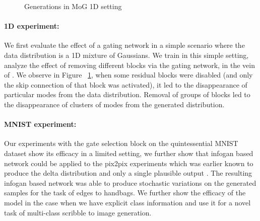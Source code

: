 \begin{figure}[t]
    \centering
    \caption{Generations in MoG 1D setting}
    \label{fig:onedexperiment}
    \vspace{-3mm}
\end{figure}
\paragraph{1D experiment:}
We first evaluate the effect of a gating network in a simple scenario where the data distribution is a 1D mixture of Gaussians. 
We train \model{} in this simple setting, analyze the effect of removing different blocks via the gating network, in the vein of \cite{veit2016residual}.
We observe in Figure ~\ref{fig:onedexperiment}, when some residual blocks were disabled (and only the skip connection of that block was activated), it led to the disappearance of particular modes from the data distribution. 
Removal of groups of blocks led to the disappearance of clusters of modes from the generated distribution. 



\paragraph{MNIST experiment:}
Our experiments with the gate selection block on the quintessential MNIST dataset show its efficacy in a limited setting, we further show that infogan based network could be applied to the pix2pix experiments which was earlier known to produce the delta distribution and only a single plausible output \cite{ghosh2017multi}. The resulting infogan based network was able to produce stochastic variations on the generated samples for the task of edges to handbags. We further show the efficacy of the model in the case when we have explicit class information and use it for a novel task of multi-class scribble to image generation. 



